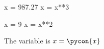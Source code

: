 \documentclass[11pt]{article}%
\begin{document}
\begin{pyconsole}
x = 987.27
x = x**3
\end{pyconsole}


\begin{pyconsole}
x = 9
x = x**2
\end{pyconsole}
The variable is $x=\pycon{x}$
\end{document}
